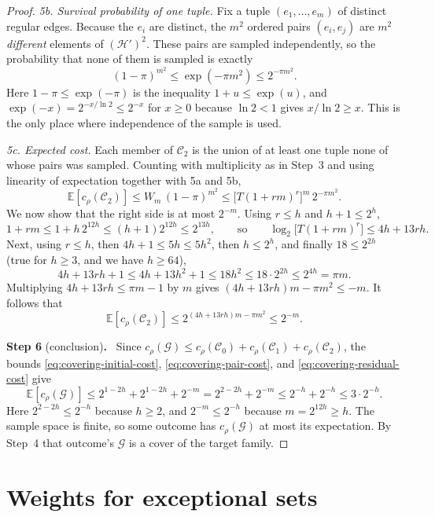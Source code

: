 \documentclass[11pt,letterpaper]{article}
\theoremstyle{definition}
\theoremstyle{remark}
\numberwithin{equation}{section}
\newcommand{\step}[2]{\medskip\noindent\textbf{Step #1} (#2)\textbf{.}\ }
\begin{document}
\begin{proof}
\emph{5b. Survival probability of one tuple.} Fix a tuple
$(e_1,\ldots,e_m)$ of distinct regular edges. Because the $e_i$ are
distinct, the $m^2$ ordered pairs $(e_i,e_j)$ are $m^2$ \emph{different}
elements of $(\mathcal H')^2$. These pairs are sampled independently, so
the probability that none of them is sampled is exactly
\[
(1-\pi)^{m^2}\le \exp(-\pi m^2)\le2^{-\pi m^2}.
\]
Here $1-\pi\le\exp(-\pi)$ is the inequality $1+u\le\exp(u)$, and
$\exp(-x)=2^{-x/\ln2}\le2^{-x}$ for $x\ge0$ because $\ln2<1$ gives
$x/\ln2\ge x$. This is the only place where independence of the sample is
used.

\emph{5c. Expected cost.} Each member of $\mathcal C_2$ is the union of at
least one tuple none of whose pairs was sampled. Counting with
multiplicity as in Step~3 and using linearity of expectation together
with 5a and 5b,
\[
\mathbb E[c_\rho(\mathcal C_2)]
\le W_m\,(1-\pi)^{m^2}
\le\bigl[T(1+rm)^r\bigr]^m\,2^{-\pi m^2}.
\]
We now show that the right side is at most $2^{-m}$. Using $r\le h$ and
$h+1\le2^h$,
\[
1+rm\le1+h\,2^{12h}\le(h+1)2^{12h}\le2^{13h},
\qquad\text{so}\qquad
\log_2\bigl[T(1+rm)^r\bigr]\le4h+13rh .
\]
Next, using $r\le h$, then $4h+1\le5h\le5h^2$, then $h\le2^h$, and finally
$18\le2^{2h}$ (true for $h\ge3$, and we have $h\ge64$),
\[
4h+13rh+1\le4h+13h^2+1\le18h^2\le18\cdot2^{2h}\le2^{4h}=\pi m .
\]
Multiplying $4h+13rh\le\pi m-1$ by $m$ gives
$(4h+13rh)m-\pi m^2\le-m$. It follows that
\begin{equation}\label{eq:covering-residual-cost}
\mathbb E[c_\rho(\mathcal C_2)]
\le2^{(4h+13rh)m-\pi m^2}\le2^{-m}.
\end{equation}

\step{6}{conclusion}
Since $c_\rho(\mathcal G)\le c_\rho(\mathcal C_0)+c_\rho(\mathcal C_1)
+c_\rho(\mathcal C_2)$, the bounds \eqref{eq:covering-initial-cost},
\eqref{eq:covering-pair-cost}, and \eqref{eq:covering-residual-cost} give
\[
\mathbb E[c_\rho(\mathcal G)]
\le2^{1-2h}+2^{1-2h}+2^{-m}=2^{2-2h}+2^{-m}\le2^{-h}+2^{-h}\le3\cdot2^{-h}.
\]
Here $2^{2-2h}\le2^{-h}$ because $h\ge2$, and $2^{-m}\le2^{-h}$ because
$m=2^{12h}\ge h$. The sample space is finite, so some outcome has
$c_\rho(\mathcal G)$ at most its expectation. By Step~4 that outcome's
$\mathcal G$ is a cover of the target family.
\end{proof}

\section{Weights for exceptional sets}
\label{sec:weights}
\end{document}
